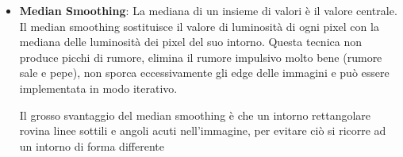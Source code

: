 \begin{itemize}
	\item \textbf{Median Smoothing}: La mediana di un insieme di valori è il valore centrale. Il median smoothing sostituisce il valore di luminosità di ogni pixel con la mediana delle luminosità dei pixel del suo intorno. Questa tecnica non produce picchi di rumore, elimina il rumore impulsivo molto bene (rumore sale e pepe), non sporca eccessivamente gli edge delle immagini e può essere implementata in modo iterativo.
	
	Il grosso svantaggio del median smoothing è che un intorno rettangolare rovina linee sottili e angoli acuti nell'immagine, per evitare ciò si ricorre ad un intorno di forma differente
\end{itemize}